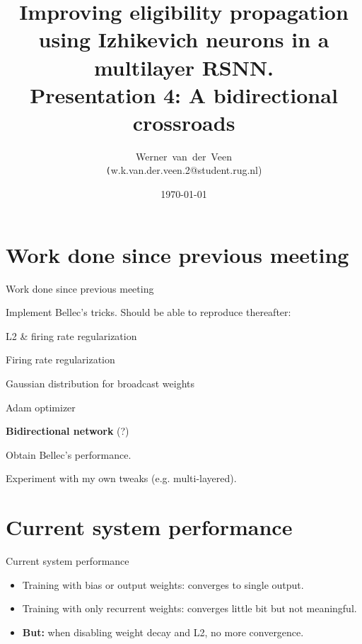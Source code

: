 \documentclass[t]{beamer}
\title[Eligibility propagation]{Improving eligibility propagation using Izhikevich neurons in a multilayer RSNN.\\\vspace{10pt}
\large{Presentation 4: A bidirectional crossroads}}
\author[Werner]{Werner~van~der~Veen\\\tiny\texttt({w.k.van.der.veen.2@student.rug.nl})}\date{\today}
\newcommand{\cmark}{\ding{51}}%
\newcommand{\done}{\rlap{$\square$}{\raisebox{2pt}{\large\hspace{1pt}\cmark}}%
\hspace{-2.5pt}}
\begin{document}
\begin{frame}
    \titlepage
\end{frame}



\small
\section{Work done since previous meeting}
\begin{frame}{Work done since previous meeting}
	\begin{todolist}

    \item[\done] Implement Bellec's tricks. Should be able to reproduce thereafter:
    \begin{todolist}
    	\item[\done] L2 \& firing rate regularization
    	\item[\done] Firing rate regularization
    	\item[\done] Gaussian distribution for broadcast weights
    	\item[\done] Adam optimizer
    \end{todolist}
    \item \textbf{Bidirectional network} (?)
    \item Obtain Bellec's performance.
    \item Experiment with my own tweaks (e.g. multi-layered).
  \end{todolist}
\end{frame}

\section{Current system performance}
\begin{frame}{Current system performance}
	
	\begin{itemize}[label=--]
	\item Training with bias or output weights: converges to single output.
	\item Training with only recurrent weights: converges little bit but not meaningful.
	\item \textbf{But:} when disabling weight decay and L2, no more convergence.
	\end{itemize}
\end{frame}
\end{document}
